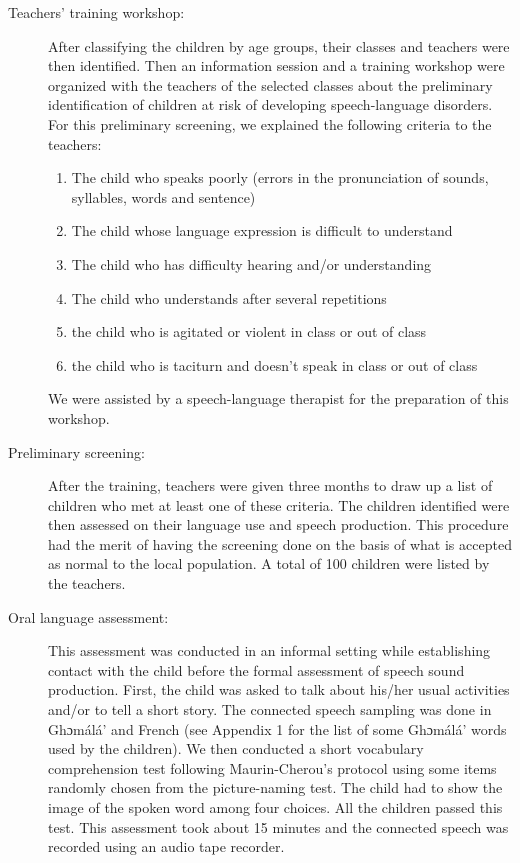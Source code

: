 \documentclass[output=paper,newtxmath,modfonts,nonflat,draftmode]{langsci/langscibook}
\begin{document}
\begin{description}
\item[Teachers’ training workshop:] After classifying the children by age groups, their classes and teachers were then identified. Then an information session and a training workshop were organized with the teachers of the selected classes about the preliminary identification of children at risk of developing speech-language disorders. For this preliminary screening, we explained the following criteria to the teachers:

\begin{enumerate}
    \item The child who speaks poorly (errors in the pronunciation of sounds, syllables, words and sentence)
    \item The child whose language expression is difficult to understand
    \item The child who has difficulty hearing and/or understanding
    \item The child who understands after several repetitions
    \item the child who is agitated or violent in class or out of class
    \item the child who is taciturn and doesn’t speak in class or out of class
\end{enumerate}

We were assisted by a speech-language therapist for the preparation of this workshop. 

\item[Preliminary screening:] After the training, teachers were given three months to draw up a list of children who met at least one of these criteria. The children identified were then assessed on their language use and speech production. This procedure had the merit of having the screening done on the basis of what is accepted as normal to the local population. A total of 100 children were listed by the teachers.

\item [Oral language assessment:] This assessment was conducted in an informal setting while establishing contact with the child before the formal assessment of speech sound production. First, the child was asked to talk about his/her usual activities and/or to tell a short story. The connected speech sampling was done in Ghɔmálá’ and French (see Appendix 1 for the list of some Ghɔmálá’ words used by the children). We then conducted a short vocabulary comprehension test following Maurin-Cherou’s protocol using some items randomly chosen from the picture-naming test. The child had to show the image of the spoken word among four choices. All the children passed this test. This assessment took about 15 minutes and the connected speech was recorded using an audio tape recorder. 


\end{description}
\end{document}
